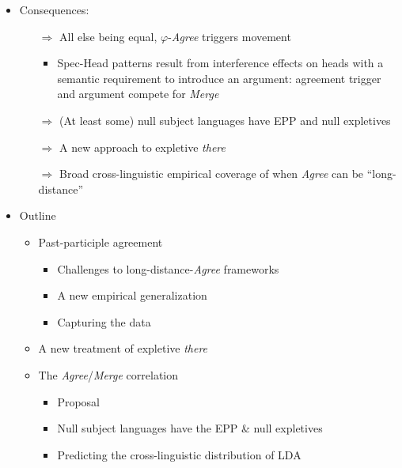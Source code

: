 \documentclass[letterpaper,10pt]{handout_nick}
\begin{document}
\begin{itemize}
\item Consequences: 
\begin{itemize}
\item[$\Rightarrow$] All else being equal, $\varphi$-\emph{Agree} triggers movement 
\begin{itemize}
\item Spec-Head patterns result from interference effects on heads with a semantic requirement to introduce an argument: agreement trigger and argument compete for \emph{Merge}
\end{itemize}
\item[$\Rightarrow$] (At least some) null subject languages have EPP and null expletives
\item[$\Rightarrow$] A new approach to expletive \emph{there}
\item[$\Rightarrow$] Broad cross-linguistic empirical coverage of when \emph{Agree} can be ``long-distance''
\end{itemize}
\item Outline
\begin{itemize}
\item Past-participle agreement
\begin{itemize}
\item Challenges to long-distance-\emph{Agree} frameworks
\item A new empirical generalization
\item Capturing the data
\end{itemize}
\item A new treatment of expletive \emph{there}
\item The \emph{Agree}/\emph{Merge} correlation
\begin{itemize}
\item Proposal
\item Null subject languages have the EPP \& null expletives
\item Predicting the cross-linguistic distribution of LDA
\end{itemize}
\end{itemize}
\end{itemize}
\end{document}
